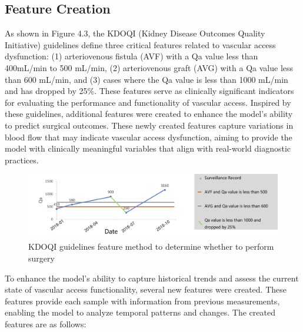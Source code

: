 \subsection{Feature Creation}

As shown in Figure 4.3, the KDOQI (Kidney Disease Outcomes Quality Initiative) guidelines define three critical features related to vascular access dysfunction: (1) arteriovenous fistula (AVF) with a Qa value less than 400mL/min to 500 mL/min, (2) arteriovenous graft (AVG) with a Qa value less than 600 mL/min, and (3) cases where the Qa value is less than 1000 mL/min and has dropped by 25\%. These features serve as clinically significant indicators for evaluating the performance and functionality of vascular access. Inspired by these guidelines, additional features were created to enhance the model's ability to predict surgical outcomes. These newly created features capture variations in blood flow that may indicate vascular access dysfunction, aiming to provide the model with clinically meaningful variables that align with real-world diagnostic practices. 

\begin{figure}[H]
    \centering
    \includegraphics[width=1\linewidth]{figures/KDOQI guidelines.png}
    \caption{KDOQI guidelines feature method to determine whether to perform surgery}
    \label{fig:enter-label}
\end{figure}

To enhance the model's ability to capture historical trends and assess the current state of vascular access functionality, several new features were created. These features provide each sample with information from previous measurements, enabling the model to analyze temporal patterns and changes. The created features are as follows:

